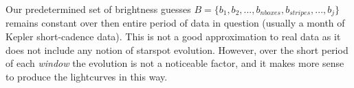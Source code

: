 Our predetermined set of brightness guesses $B = \{b_1, b_2, ..., b_{nboxes}, b_{stripes}, ..., b_j\}$ remains constant over then entire period of data in question (usually a month of Kepler short-cadence data). This is not a good approximation to real data as it does not include any notion of starspot evolution. However, over the short period of each {\it window} the evolution is not a noticeable factor, and it makes more sense to produce the lightcurves in this way.



